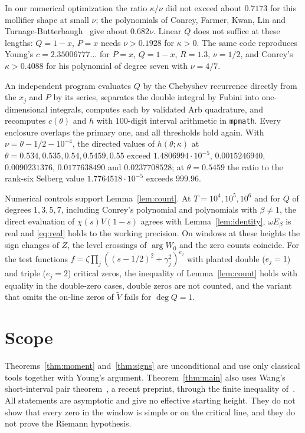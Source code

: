 \documentclass[11pt]{article}
\theoremstyle{remark}
\newcommand{\Vt}{\widetilde V}
\begin{document}
In our numerical optimization the ratio $\kappa/\nu$ did not exceed about
$0.7173$ for this mollifier shape at small $\nu$; the polynomials of Conrey,
Farmer, Kwan, Lin and Turnage-Butterbaugh~\cite{CFKL} give about $0.682\nu$.
Linear $Q$ does not suffice at these lengths: $Q=1-x$, $P=x$ needs
$\nu>0.1928$ for $\kappa>0$. The same code reproduces Young's
$c=2.35006777\ldots$ for $P=x$, $Q=1-x$, $R=1.3$, $\nu=1/2$, and Conrey's
$\kappa>0.4088$ for his polynomial of degree seven with $\nu=4/7$.

An independent program evaluates $Q$ by the Chebyshev recurrence directly
from the $x_j$ and $P$ by its series, separates the double integral by
Fubini into one-dimensional integrals, computes each by validated Arb
quadrature, and recomputes $c(\theta)$ and $h$ with $100$-digit interval
arithmetic in \texttt{mpmath}. Every enclosure overlaps the primary one, and
all thresholds hold again. With $\nu=\theta-1/2-10^{-4}$, the directed values
of $h(\theta;\kappa)$ at $\theta=0.534,0.535,0.54,0.5459,0.55$ exceed
$1.4806994\cdot10^{-5}$, $0.0015246940$, $0.0090231376$, $0.0177638490$ and
$0.0237708528$; at $\theta=0.5459$ the ratio to the rank-six Selberg value
$1.7764518\cdot10^{-5}$ exceeds $999.96$.

Numerical controls support Lemma~\ref{lem:count}. At $T=10^4,10^5,10^6$ and
for $Q$ of degrees $1,3,5,7$, including Conrey's polynomial and polynomials
with $\beta\ne1$, the direct evaluation of $\chi(s)V(1-s)$ agrees with
Lemma~\ref{lem:identity}, $\omega E_\beta$ is real and \eqref{eq:real} holds to
the working precision. On windows at these heights the sign changes of $Z$,
the level crossings of $\arg W_0$ and the zero counts coincide. For the test
functions $f=\zeta\prod_j((s-1/2)^2+\gamma_j^2)^{e_j}$ with planted double
($e_j=1$) and triple ($e_j=2$) critical zeros, the inequality of
Lemma~\ref{lem:count} holds with equality in the double-zero cases, double
zeros are not counted, and the variant that omits the on-line zeros of $\Vt$
fails for $\deg Q=1$.

\section{Scope}

Theorems~\ref{thm:moment} and~\ref{thm:signs} are unconditional and use only
classical tools together with Young's argument. Theorem~\ref{thm:main} also
uses Wang's short-interval pair theorem~\cite{WangShort}, a recent preprint,
through the finite inequality of~\cite{CAOSShort}. All statements are
asymptotic and give no effective starting height. They do not show that
every zero in the window is simple or on the critical line, and they do not
prove the Riemann hypothesis.
\end{document}
